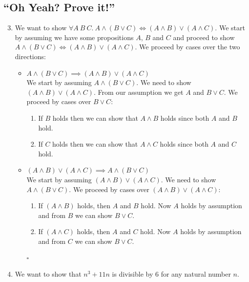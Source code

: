 \documentclass{tufte-handout}
\begin{document}
\subsection{``Oh Yeah? Prove it!''}

\begin{enumerate}
\setcounter{enumi}{2}
\item We want to show
  $\forall A~B~C. ~A \land (B \lor C) \iff (A \land B) \lor (A
  \land C)$. We start by assuming we have some propositions $A$,
  $B$ and $C$ and proceed to show
  $A \land (B \lor C) \iff (A \land B) \lor (A \land C)$. We
  proceed by cases over the two directions:
  \begin{itemize}
  \item[\textbf{Case 1:}] $A \land (B \lor C) \implies (A \land B) \lor (A \land C)$\\
    We start by assuming $A \land (B \lor C)$. We need to
    show $(A \land B) \lor (A \land C)$.
    From our assumption we get $A$ and $B \lor C$. We proceed by
    cases over $B \lor C$:
    \begin{enumerate}
    \item If $B$ holds then we can show that $A \land B$ holds
      since both $A$ and $B$ hold.
    \item If $C$ holds then we can show that $A \land C$ holds
      since both $A$ and $C$ hold.
    \end{enumerate}

  \item[\textbf{Case 2:}]
    $(A \land B) \lor (A \land C) \implies A \land (B \lor C)$\\
    We start by assuming $(A \land B) \lor (A \land C)$. We need
    to show $A \land (B \lor C)$. We proceed by cases over
    $(A \land B) \lor (A \land C)$:
    \begin{enumerate}
    \item If $(A \land B)$ holds, then $A$ and $B$ hold. Now $A$
      holds by assumption and from $B$ we can show $B \lor C$.
    \item If $(A \land C)$ holds, then $A$ and $C$ hold. Now $A$
      holds by assumption and from $C$ we can show $B \lor C$.
    \end{enumerate}
    $\square$
  \end{itemize}

\item We want to show that $n^3 + 11n$ is divisible by $6$ for any
  natural number $n$.


\end{enumerate}
\end{document}

